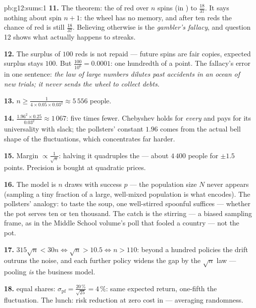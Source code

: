 \begin{solution}{pb:g12:sums:1}
\textbf{11.} The theorem: the \emph{} of red over
$n$ spins  (in ) to $\frac{18}{37}$. It
says nothing about spin $n + 1$: the wheel has no memory, and
after ten reds the chance of red is still $\frac{18}{37}$.
Believing otherwise is the \emph{gambler's fallacy}, and
question 12 shows what actually happens to streaks.

\textbf{12.} The surplus of $100$ reds is not repaid ---
future spins are fair copies, expected surplus stays $100$.
But $\frac{100}{10^6} = 0.0001$: one hundredth of a point.
The fallacy's error in one sentence: \emph{the law of large
numbers dilutes past accidents in an ocean of new trials; it
never sends the wheel to collect debts.}

\textbf{13.} $n \geq \frac{1}{4 \times 0.05 \times 0.03^2}
\approx 5\,556$ people.

\textbf{14.} $\frac{1.96^2 \times 0.25}{0.03^2} \approx
1\,067$: five times fewer. Chebyshev holds for \emph{every}
 and pays for its universality with slack; the
pollsters' constant $1.96$ comes from the actual bell shape
of the fluctuations, which concentrates far harder.

\textbf{15.} Margin $\propto \frac{1}{\sqrt n}$: halving it
quadruples the  --- about $4\,400$ people for
$\pm 1.5$ points. Precision is bought at quadratic prices.

\textbf{16.} The model is $n$  draws with success
 $p$ --- the population size $N$ never appears
(sampling a tiny fraction of a large, well-mixed population
is what  encodes). The pollsters' analogy: to
taste the soup, one well-stirred spoonful suffices ---
whether the pot serves ten or ten thousand. The catch is the
stirring --- a biased sampling frame, as in the Middle School
volume's poll that fooled a country --- not the pot.

\textbf{17.} $315\sqrt n < 30n \iff \sqrt n > 10.5 \iff
n > 110$: beyond a hundred policies the drift outruns the
noise, and each further policy widens the gap by the
$\sqrt n$ law --- pooling \emph{is} the business model.

\textbf{18.}  equal shares: $\sigma_{\text{pf}} =
\frac{20\,\%}{\sqrt{25}} = 4\,\%$: same expected return,
one-fifth the fluctuation. The lunch: risk reduction at zero
cost in  --- averaging  randomness.


\end{solution}
